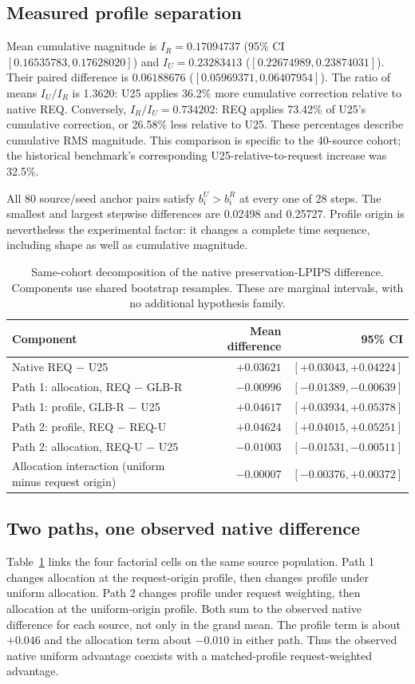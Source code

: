 \documentclass[10pt,doubleanonymous]{ieeeconf}
\begin{document}
\subsection{Measured profile separation}
Mean cumulative magnitude is $I_R=0.17094737$ (95\% CI $[0.16535783,0.17628020]$) and $I_U=0.23283413$ ($[0.22674989,0.23874031]$). Their paired difference is $0.06188676$ ($[0.05969371,0.06407954]$). The ratio of means $I_U/I_R$ is 1.3620: U25 applies 36.2\% more cumulative correction relative to native REQ. Conversely, $I_R/I_U=0.734202$: REQ applies 73.42\% of U25's cumulative correction, or 26.58\% less relative to U25. These percentages describe cumulative RMS magnitude. This comparison is specific to the 40-source cohort; the historical benchmark's corresponding U25-relative-to-request increase was 32.5\%.

All 80 source/seed anchor pairs satisfy $b_i^U>b_i^R$ at every one of 28 steps. The smallest and largest stepwise differences are 0.02498 and 0.25727. Profile origin is nevertheless the experimental factor: it changes a complete time sequence, including shape as well as cumulative magnitude.

\begin{table}[!t]
\centering\small
\caption{Same-cohort decomposition of the native preservation-LPIPS difference. Components use shared bootstrap resamples. These are marginal intervals, with no additional hypothesis family.}
\label{tab:paths}
\begin{tabular}{lrr}
\toprule
Component & Mean difference & 95\% CI\\
\midrule
Native REQ $-$ U25 & $+0.03621$ & $[+0.03043,+0.04224]$\\
Path 1: allocation, REQ $-$ GLB-R & $-0.00996$ & $[-0.01389,-0.00639]$\\
Path 1: profile, GLB-R $-$ U25 & $+0.04617$ & $[+0.03934,+0.05378]$\\
Path 2: profile, REQ $-$ REQ-U & $+0.04624$ & $[+0.04015,+0.05251]$\\
Path 2: allocation, REQ-U $-$ U25 & $-0.01003$ & $[-0.01531,-0.00511]$\\
Allocation interaction (uniform minus request origin) & $-0.00007$ & $[-0.00376,+0.00372]$\\
\bottomrule
\end{tabular}
\end{table}

\subsection{Two paths, one observed native difference}
Table~\ref{tab:paths} links the four factorial cells on the same source population. Path 1 changes allocation at the request-origin profile, then changes profile under uniform allocation. Path 2 changes profile under request weighting, then allocation at the uniform-origin profile. Both sum to the observed native difference for each source, not only in the grand mean. The profile term is about $+0.046$ and the allocation term about $-0.010$ in either path. Thus the observed native uniform advantage coexists with a matched-profile request-weighted advantage.
\end{document}
